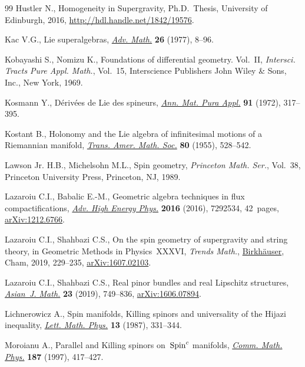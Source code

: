 \documentclass[pdftex]{sigma}
\numberwithin{equation}{section}
\newcommand{\1}{\mathbbm{1}}
\begin{document}
\begin{thebibliography}{99}
Hustler N., Homogeneity in Supergravity, Ph.D.~Thesis, {U}niversity of
 Edinburgh, 2016, \url{http://hdl.handle.net/1842/19576}.

Kac V.G., Lie superalgebras,
 \href{https://doi.org/10.1016/0001-8708(77)90017-2}{\textit{Adv. Math.}}
 \textbf{26} (1977), 8--96.

Kobayashi S., Nomizu K., Foundations of differential geometry. {V}ol.~{II},
 \textit{Intersci. Tracts Pure Appl. Math.}, Vol.~15, Interscience Publishers
 John Wiley \& Sons, Inc., New York, 1969.

Kosmann Y., D\'eriv\'ees de {L}ie des spineurs,
 \href{https://doi.org/10.1007/BF02428822}{\textit{Ann. Mat. Pura Appl.}}
 \textbf{91} (1972), 317--395.

Kostant B., Holonomy and the {L}ie algebra of infinitesimal motions of a
 {R}iemannian manifold, \href{https://doi.org/10.2307/1993001}{\textit{Trans.
 Amer. Math. Soc.}} \textbf{80} (1955), 528--542.

Lawson Jr. H.B., Michelsohn M.L., Spin geometry, \textit{Princeton Math. Ser.},
 Vol.~38, Princeton University Press, Princeton, NJ, 1989.

Lazaroiu C.I., Babalic E.-M., Geometric algebra techniques in flux
 compactifications, \href{https://doi.org/10.1155/2016/7292534}{\textit{Adv.
 High Energy Phys.}} \textbf{2016} (2016), 7292534, 42~pages,
 \href{http://arxiv.org/abs/1212.6766}{arXiv:1212.6766}.

Lazaroiu C.I., Shahbazi C.S., On the spin geometry of supergravity and string
 theory, in Geometric {M}ethods in {P}hysics~{XXXVI}, \textit{Trends Math.},
 \href{https://doi.org/10.1007/978-3-030-01156-7_25}{Birkh\"auser}, Cham,
 2019, 229--235, \href{http://arxiv.org/abs/1607.02103}{arXiv:1607.02103}.

Lazaroiu C.I., Shahbazi C.S., Real pinor bundles and real {L}ipschitz
 structures,
 \href{https://doi.org/10.4310/AJM.2019.v23.n5.a3}{\textit{Asian~J. Math.}}
 \textbf{23} (2019), 749--836,
 \href{http://arxiv.org/abs/1606.07894}{arXiv:1606.07894}.

Lichnerowicz A., Spin manifolds, {K}illing spinors and universality of the
 {H}ijazi inequality, \href{https://doi.org/10.1007/BF00401162}{\textit{Lett.
 Math. Phys.}} \textbf{13} (1987), 331--344.

Moroianu A., Parallel and {K}illing spinors on~{${\rm Spin}^c$} manifolds,
 \href{https://doi.org/10.1007/s002200050142}{\textit{Comm. Math. Phys.}}
 \textbf{187} (1997), 417--427.


\end{thebibliography}
\end{document}
